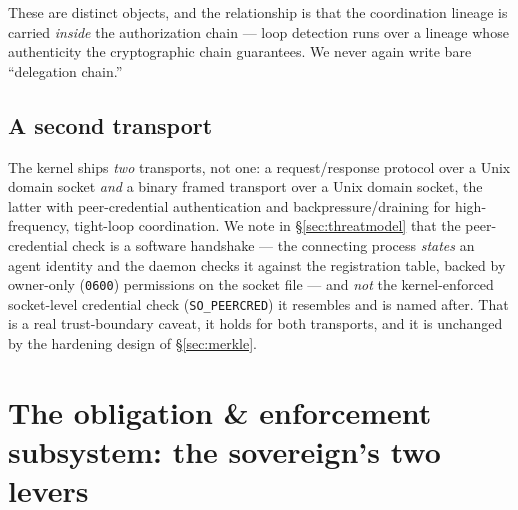 \documentclass[11pt,a4paper]{article}
\theoremstyle{definition}
\theoremstyle{remark}
\begin{document}
These are distinct objects, and the relationship is that the coordination lineage
is carried \emph{inside} the authorization chain --- loop detection runs over a
lineage whose authenticity the cryptographic chain guarantees. We never again write
bare ``delegation chain.''



\FloatBarrier

\subsection{A second transport}

%
The kernel ships \emph{two} transports, not one: a request/response protocol over a
Unix domain socket \emph{and} a binary framed transport over a Unix domain socket,
the latter with peer-credential authentication and backpressure/draining for
high-frequency, tight-loop coordination. We note in \S\ref{sec:threatmodel} that
the peer-credential check is a software handshake --- the connecting process
\emph{states} an agent identity and the daemon checks it against the registration
table, backed by owner-only (\texttt{0600}) permissions on the socket file --- and
\emph{not} the kernel-enforced socket-level credential check
(\texttt{SO\_PEERCRED}) it resembles and is named after. That is a real
trust-boundary caveat, it holds for both transports, and it is unchanged by the
hardening design of \S\ref{sec:merkle}.

\pdexercisepointer{\ref{ex:swk-decay-honest}}{\ref{ex:swk-op8-decay}}{\pageref{ex:swk-decay-honest}}

\section{The obligation \& enforcement subsystem: the sovereign's two levers}
\label{sec:enforcement}
\end{document}
